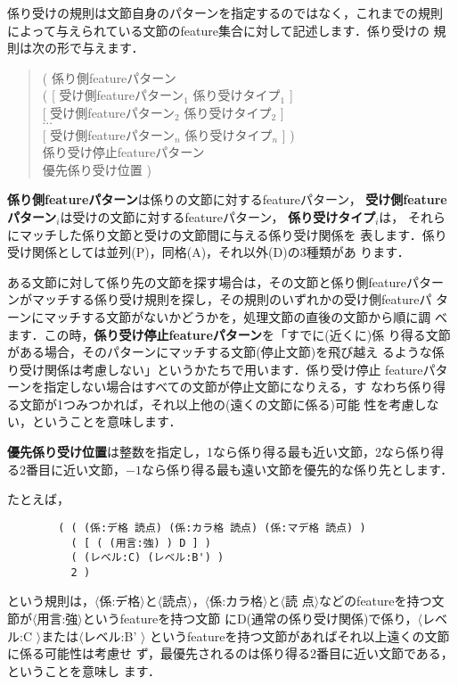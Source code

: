 \documentclass[a4j,11pt,titlepage]{jarticle}
\def\fl{$\langle$}
\def\fr{$\rangle$}
\begin{document}
係り受けの規則は文節自身のパターンを指定するのではなく，これまでの規則
によって与えられている文節のfeature集合に対して記述します．係り受けの
規則は次の形で与えます．
\begin{quote}
\hspace*{1cm} ( 係り側featureパターン \\
\hspace*{2cm}    ( [ 受け側featureパターン$_1$ 係り受けタイプ$_1$ ] \\
\hspace*{2.3cm}      [ 受け側featureパターン$_2$ 係り受けタイプ$_2$ ] \\
\hspace*{4cm}          $\cdots$ \\
\hspace*{2.3cm}      [ 受け側featureパターン$_n$ 係り受けタイプ$_n$ ] ) \\
\hspace*{2cm}    係り受け停止featureパターン  \\
\hspace*{2cm}    優先係り受け位置 ) 
\end{quote}

{\bf 係り側featureパターン}は係りの文節に対するfeatureパターン，
{\bf 受け側featureパターン$_i$}は受けの文節に対するfeatureパターン，
{\bf 係り受けタイプ$_i$}は，
それらにマッチした係り文節と受けの文節間に与える係り受け関係を
表します．係り受け関係としては並列(P)，同格(A)，それ以外(D)の3種類があ
ります．

ある文節に対して係り先の文節を探す場合は，その文節と係り側featureパター
ンがマッチする係り受け規則を探し，その規則のいずれかの受け側featureパ
ターンにマッチする文節がないかどうかを，処理文節の直後の文節から順に調
べます．この時，{\bf 係り受け停止featureパターン}を「すでに(近くに)係
り得る文節がある場合，そのパターンにマッチする文節(停止文節)を飛び越え
るような係り受け関係は考慮しない」というかたちで用います．係り受け停止
featureパターンを指定しない場合はすべての文節が停止文節になりえる，す
なわち係り得る文節が1つみつかれば，それ以上他の(遠くの文節に係る)可能
性を考慮しない，ということを意味します．

{\bf 優先係り受け位置}は整数を指定し，1なら係り得る最も近い文節，2なら係り得
る2番目に近い文節，$-1$なら係り得る最も遠い文節を優先的な係り先とします．

たとえば，
\begin{verbatim}
        ( ( (係:デ格 読点) (係:カラ格 読点) (係:マデ格 読点) )
          ( [ ( (用言:強) ) D ] )
          ( (レベル:C) (レベル:B') )
          2 )
\end{verbatim}
という規則は，\fl 係:デ格\fr と\fl 読点\fr ，\fl 係:カラ格\fr と\fl 読
点\fr などのfeatureを持つ文節が\fl 用言:強\fr というfeatureを持つ文節
にD(通常の係り受け関係)で係り，\fl レベル:C \fr または\fl レベル:B' \fr 
というfeatureを持つ文節があればそれ以上遠くの文節に係る可能性は考慮せ
ず，最優先されるのは係り得る2番目に近い文節である，ということを意味し
ます．
\end{document}

